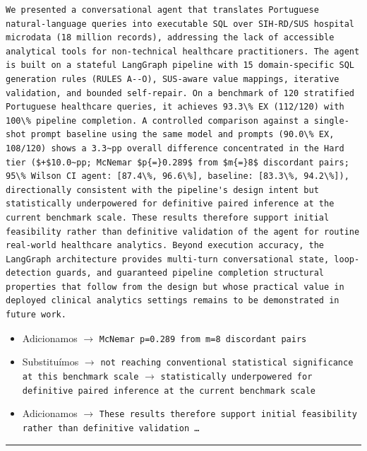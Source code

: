 \documentclass[11pt,a4paper]{article}
\begin{document}
\begin{finalblock}
\begin{lstlisting}[style=texsnippet]
We presented a conversational agent that translates Portuguese natural-language queries into executable SQL over SIH-RD/SUS hospital microdata (18 million records), addressing the lack of accessible analytical tools for non-technical healthcare practitioners. The agent is built on a stateful LangGraph pipeline with 15 domain-specific SQL generation rules (RULES A--O), SUS-aware value mappings, iterative validation, and bounded self-repair. On a benchmark of 120 stratified Portuguese healthcare queries, it achieves 93.3\% EX (112/120) with 100\% pipeline completion. A controlled comparison against a single-shot prompt baseline using the same model and prompts (90.0\% EX, 108/120) shows a 3.3~pp overall difference concentrated in the Hard tier ($+$10.0~pp; McNemar $p{=}0.289$ from $m{=}8$ discordant pairs; 95\% Wilson CI agent: [87.4\%, 96.6\%], baseline: [83.3\%, 94.2\%]), directionally consistent with the pipeline's design intent but statistically underpowered for definitive paired inference at the current benchmark scale. These results therefore support initial feasibility rather than definitive validation of the agent for routine real-world healthcare analytics. Beyond execution accuracy, the LangGraph architecture provides multi-turn conversational state, loop-detection guards, and guaranteed pipeline completion structural properties that follow from the design but whose practical value in deployed clinical analytics settings remains to be demonstrated in future work.
\end{lstlisting}
\end{finalblock}

\begin{trackblock}
\begin{itemize}
  \item Adicionamos $\to$ \texttt{McNemar p=0.289 from m=8 discordant pairs}
  \item Substituímos $\to$ \texttt{not reaching conventional statistical significance at this benchmark scale} $\to$ \texttt{statistically underpowered for definitive paired inference at the current benchmark scale}
  \item Adicionamos $\to$ \texttt{These results therefore support initial feasibility rather than definitive validation \ldots}
\end{itemize}
\end{trackblock}

\bigskip\hrule\bigskip
\end{document}
